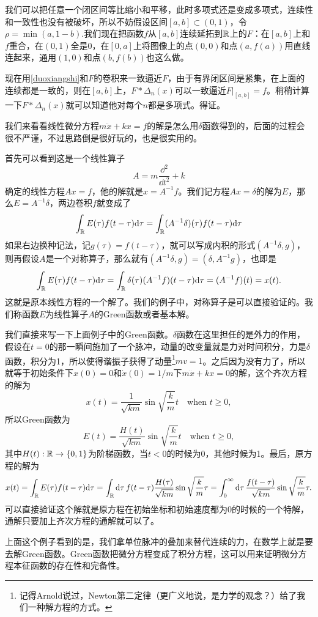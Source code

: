 \documentclass[10pt]{book}
\theoremstyle{plain}%
\begin{document}
我们可以把任意一个闭区间等比缩小和平移，此时多项式还是变成多项式，连续性和一致性也没有被破坏，所以不妨假设区间$[a,b]\subset (0,1)$，令$\rho=\min(a,1-b)$.我们现在把函数$f$从$[a,b]$连续延拓到$\mathbb{R}$上的$F$：在$[a,b]$上和$f$重合，在$(0,1)$全是0，在$[0,a]$上将图像上的点$(0,0)$和点$(a,f(a))$用直线连起来，通用$(1,0)$和点$(b,f(b))$也这么做。

现在用\eqref{duoxiangshi}和$F$的卷积来一致逼近$F$，由于有界闭区间是紧集，在上面的连续都是一致的，则在$[a,b]$上，$F*\Delta_n(x)$可以一致逼近$F|_{[a,b]}=f$。稍稍计算一下$F*\Delta_n(x)$就可以知道他对每个$n$都是多项式。得证。

我们来看看线性微分方程$m\ddot{x}+kx=f$的解是怎么用$\delta$函数得到的，后面的过程会很不严谨，不过思路倒是很好玩的，也是很实用的。

首先可以看到这是一个线性算子
\[
A=m\frac{\dd^2}{\dd t^2}+k
\]
确定的线性方程$Ax=f$，他的解就是$x=A^{-1}f$。我们记方程$Ax=\delta$的解为$E$，那么$E=A^{-1}\delta$，两边卷积$f$就变成了
\[
	\int_{\mathbb{R}} E(\tau)f(t-\tau)\mathrm{d} \tau=\int_{\mathbb{R}} (A^{-1}\delta)(\tau)f(t-\tau) \mathrm{d} \tau
\]
如果右边换种记法，记$g(\tau)=f(t-\tau)$，就可以写成内积的形式$(A^{-1}\delta,g)$，则再假设$A$是一个对称算子，那么就有$(A^{-1}\delta,g)=(\delta,A^{-1}g)$，也即是
\[
	\int_{\mathbb{R}} E(\tau)f(t-\tau)\mathrm{d} \tau=\int_{\mathbb{R}} \delta(\tau)(A^{-1}f)(t-\tau) \mathrm{d} \tau=(A^{-1}f)(t)=x(t).
\]
这就是原本线性方程的一个解了。我们的例子中，对称算子是可以直接验证的。我们称函数$E$为线性算子$A$的Green函数或者基本解。

我们直接来写一下上面例子中的Green函数。$\delta$函数在这里担任的是外力的作用，假设在$t=0$的那一瞬间施加了一个脉冲，动量的改变量就是力对时间积分，力是$\delta$函数，积分为1，所以使得谐振子获得了动量\footnote{记得Arnold说过，Newton第二定律（更广义地说，是力学的观念？）给了我们一种解方程的方式。}$mv=1$。之后因为没有力了，所以就等于初始条件下$x(0)=0$和$\dot{x}(0)=1/m$下$m\ddot{x}+kx=0$的解，这个齐次方程的解为
\[
	x(t)=\frac{1}{\sqrt{km}}\sin\sqrt{\frac{k}{m}}t\quad\text{when} \,\,t\geq0,
\]
所以Green函数为
\[
	E(t)=\frac{H(t)}{\sqrt{km}}\sin\sqrt{\frac{k}{m}}t\quad \text{when} \,\,t\geq0,
\]
其中$H(t):\mathbb{R}\to\{0,1\}$为阶梯函数，当$t<0$的时候为0，其他时候为1。最后，原方程的解为
\[
x(t)=\int_{\mathbb{R}} E(\tau)f(t-\tau)\mathrm{d} \tau=\int_{\mathbb{R}} \mathrm{d} \tau\,f(t-\tau)\frac{H(\tau)}{\sqrt{km}}\sin\sqrt{\frac{k}{m}}\tau=\int_0^\infty \mathrm{d} \tau\,\frac{f(t-\tau)}{\sqrt{km}}\sin\sqrt{\frac{k}{m}}\tau.
\]
可以直接验证这个解就是原方程在初始坐标和初始速度都为0的时候的一个特解，通解只要加上齐次方程的通解就可以了。

上面这个例子看到的是，我们拿单位脉冲的叠加来替代连续的力，在数学上就是要去解Green函数。Green函数把微分方程变成了积分方程，这可以用来证明微分方程本征函数的存在性和完备性。
\end{document}

